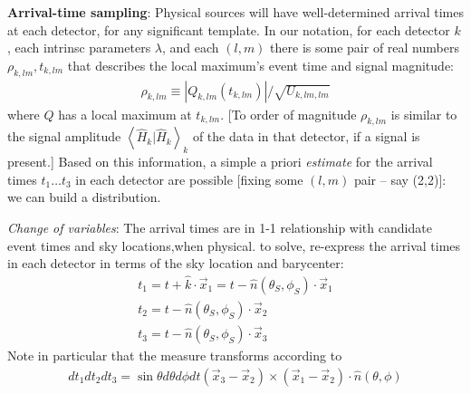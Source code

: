 \documentclass[twocolumn,prd,nofootinbib]{revtex4}
\newcommand\qmstateproduct[2]{\left\langle#1|#2\right\rangle}
\begin{document}
\begin{widetext}
\noindent \textbf{Arrival-time sampling}: Physical sources will have well-determined arrival times at each detector,
for any significant template.  In our notation, for each detector $k$, each intrinsc parameters $\lambda$, and each
$(l,m)$ there is some pair of real numbers $\rho_{k,lm},t_{k,lm}$  that describes the local maximum's event time and
signal magnitude:
\begin{eqnarray}
\rho_{k,lm} \equiv |Q_{k,lm}(t_{k,lm})|/\sqrt{U_{k,lm,lm}}
\end{eqnarray}
where $Q$ has a local maximum at $t_{k,lm}$.  
[To order of magnitude $\rho_{k,lm}$ is similar to the signal amplitude $\qmstateproduct{\hat{H}_k}{\hat{H}_k}_k$ of the
data in that detector, if a signal is present.]
%
Based on this information, a simple a priori \emph{estimate} for the arrival times $t_1\ldots t_3$ in each detector are possible
[fixing some $(l,m)$ pair -- say (2,2)]: we can build a distribution.

\noindent \emph{Change of variables}: The arrival times are in 1-1 relationship with candidate
event times and sky locations,when physical.  to solve, re-express the arrival times in each detector in terms of the
sky location and barycenter:
\begin{eqnarray}
t_1 = t + \hat{k}\cdot \vec{x}_1 
      = t - \hat{n}(\theta_S,\phi_S)\cdot \vec{x}_1 \\
t_2  = t - \hat{n}(\theta_S,\phi_S)\cdot \vec{x}_2 \\
t_3  = t - \hat{n}(\theta_S,\phi_S)\cdot \vec{x}_3 
\end{eqnarray}
Note in particular that the measure transforms according to
\begin{eqnarray}
 dt_1 dt_2 dt_3  = \sin\theta d\theta d\phi dt (\vec{x}_3-\vec{x}_2)\times(\vec{x}_1-\vec{x}_2)\cdot\hat{n}(\theta,\phi)
\end{eqnarray}


\end{widetext}
\end{document}
